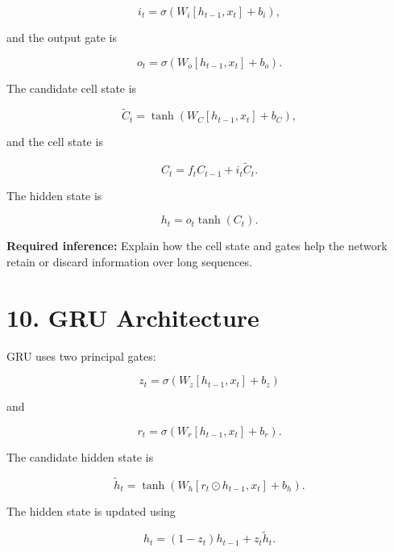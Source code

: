 \documentclass[10pt]{article}
\begin{document}
\[
i_t=\sigma(W_i[h_{t-1},x_t]+b_i),
\]

and the output gate is

\[
o_t=\sigma(W_o[h_{t-1},x_t]+b_o).
\]

The candidate cell state is

\[
\tilde{C}_t=
\tanh(W_C[h_{t-1},x_t]+b_C),
\]

and the cell state is

\[
C_t=f_tC_{t-1}+i_t\tilde{C}_t.
\]

The hidden state is

\[
h_t=o_t\tanh(C_t).
\]

\begin{center}
\end{center}

\textbf{Required inference:} Explain how the cell state and gates help the
network retain or discard information over long sequences.

\section*{10. GRU Architecture}

GRU uses two principal gates:

\[
z_t=\sigma(W_z[h_{t-1},x_t]+b_z)
\]

and

\[
r_t=\sigma(W_r[h_{t-1},x_t]+b_r).
\]

The candidate hidden state is

\[
\tilde{h}_t=
\tanh(W_h[r_t\odot h_{t-1},x_t]+b_h).
\]

The hidden state is updated using

\[
h_t=(1-z_t)h_{t-1}+z_t\tilde{h}_t.
\]

\begin{center}
\end{center}
\end{document}
